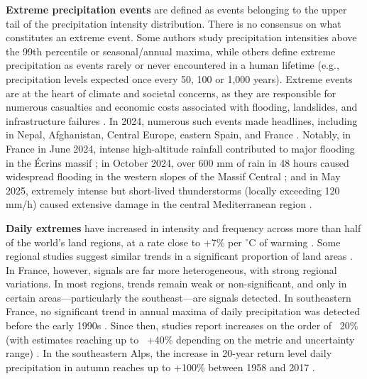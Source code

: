 \documentclass[hess, manuscript]{copernicus}
\begin{document}
\textbf{Extreme precipitation events} are defined as events belonging to the upper tail of the precipitation intensity distribution. There is no consensus
on what constitutes an extreme event. Some authors study
precipitation intensities above the 99th percentile or seasonal/annual
maxima, while others define extreme precipitation as events rarely or
never encountered in a human lifetime (e.g., precipitation levels
expected once every 50, 100 or 1,000 years). Extreme events are at the heart of climate and societal concerns, as they are responsible for numerous casualties and economic costs associated with flooding, landslides, and infrastructure failures \citep{IPCC_2022_WGIII}.
In 2024, numerous such events made headlines,
including in Nepal, Afghanistan, Central Europe, eastern Spain, and
France \citep{wmo2024}. Notably, in France in June
2024, intense high-altitude rainfall contributed to major flooding in
the Écrins massif \citep{Blanc2024}; in October 2024, over 600 mm of
rain in 48 hours caused widespread flooding in the western slopes of the Massif Central
\citep{MeteoFrance2024_episodesArdeches}; and in May 2025, extremely intense but short-lived
thunderstorms (locally exceeding 120 mm/h) caused extensive damage in
the central Mediterranean region \citep{MeteoFrance2025}.

\textbf{Daily extremes} have increased in intensity and
frequency across more than half of the world's land regions, at a rate
close to +7\% per $^\circ$C of warming \citep{IPCC2021}. Some regional studies
suggest similar trends in a significant proportion of land areas \citep{Donat2016}. In France, however, signals are far more
heterogeneous, with strong
regional variations. In most regions, trends remain weak or
non-significant, and only in certain areas---particularly the
southeast---are signals detected. In southeastern France, no significant trend in annual maxima of daily precipitation was detected before the early 1990s \citep{blanchet-creutin-2022}. Since then, studies report increases on the order of ~20\% (with estimates reaching up to ~+40\% depending on the metric and uncertainty range) \citep{Ribes2019,Blanchet2018,blanchet-creutin-2022}. In the southeastern Alps, the increase in 20-year return
level daily precipitation in autumn reaches up to +100\% between 1958 and 2017 \citep{blanchet2021explaining}. 
\end{document}

